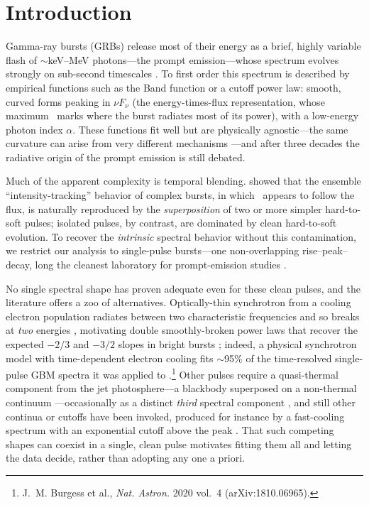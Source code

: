 \section{Introduction} \label{sec:intro}

Gamma-ray bursts (GRBs) release most of their energy as a brief, highly variable
flash of $\sim$keV--MeV photons---the prompt emission---whose spectrum evolves
strongly on sub-second timescales \citep{Norris1996,Kaneko2006,Lu2012,Yu2016}.
To first order this spectrum is described by empirical functions such as the Band
function \citep{Band1993} or a cutoff power law: smooth, curved forms peaking in
$\nu F_\nu$ (the energy-times-flux representation, whose maximum \Ep\ marks where
the burst radiates most of its power), with a low-energy photon index $\alpha$.
These functions fit well but are physically agnostic---the same curvature can
arise from very different mechanisms \citep{KumarZhang2015}---and after three
decades the radiative origin of the prompt emission is still debated.

Much of the apparent complexity is temporal blending. \citet{HakkilaPreece2011}
showed that the ensemble ``intensity-tracking'' behavior of complex bursts, in
which \Ep\ appears to follow the flux, is naturally reproduced by the
\emph{superposition} of two or more simpler hard-to-soft pulses; isolated pulses,
by contrast, are dominated by clean hard-to-soft evolution. To recover the
\emph{intrinsic} spectral behavior without this contamination, we restrict our
analysis to single-pulse bursts---one non-overlapping rise--peak--decay, long the
cleanest laboratory for prompt-emission studies
\citep{RydePeer2009,Basak2014,Yu2016,Busby2024}.

No single spectral shape has proven adequate even for these clean pulses, and the
literature offers a zoo of alternatives. Optically-thin synchrotron from a cooling
electron population radiates between two characteristic frequencies and so breaks
at \emph{two} energies \citep{Sari1998}, motivating double smoothly-broken power
laws that recover the expected $-2/3$ and $-3/2$ slopes in bright bursts
\citep{Oganesyan2017,Oganesyan2018,Ravasio2018,Ravasio2019}; indeed, a physical
synchrotron model with time-dependent electron cooling fits $\sim$95\% of the
time-resolved single-pulse GBM spectra it was applied to
\citep{Burgess2020cool}.\footnote{J.~M. Burgess et al., \textit{Nat. Astron.} 2020 vol.~4 (arXiv:1810.06965).} Other pulses require a quasi-thermal component from the
jet photosphere---a blackbody superposed on a non-thermal continuum
\citep{Ryde2004,Guiriec2010,Guiriec2011,Burgess2014a}---occasionally as a distinct
\emph{third} spectral component \citep{Guiriec2015}, and still other continua or
cutoffs have been invoked, produced for instance by a fast-cooling spectrum with an
exponential cutoff above the peak \citep{Varun2025}. That such competing shapes can
coexist in a single, clean pulse motivates fitting them all and letting the data
decide, rather than adopting any one a priori.

